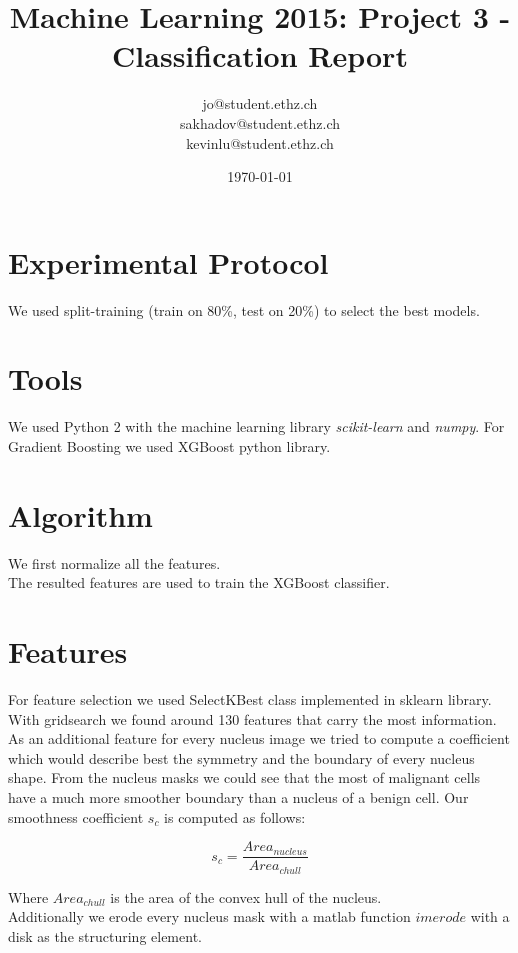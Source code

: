 \documentclass[a4paper, 11pt]{article}
\title{Machine Learning 2015: Project 3 - Classification Report}
\author{jo@student.ethz.ch\\ sakhadov@student.ethz.ch\\ kevinlu@student.ethz.ch\\}
\date{\today}
\begin{document}
\maketitle

\section*{Experimental Protocol}
We used split-training (train on 80\%, test on 20\%) to select the best models. \\




\section{Tools}
We used Python 2 with the machine learning library \textit{scikit-learn} and \textit{numpy}. For Gradient Boosting we used XGBoost python library.

\section{Algorithm}
We first normalize all the features.\\
The resulted features are used to train the XGBoost classifier.\\

\section{Features}
For feature selection we used SelectKBest class implemented in sklearn library. With gridsearch we found around 130 features that carry the most information.\\
As an additional feature for every nucleus image we tried to compute a coefficient which would describe best the symmetry and the boundary of every nucleus shape. From the nucleus masks we could see that the most of malignant cells have a much more smoother boundary than a nucleus of a benign cell. Our smoothness coefficient $s_c$ is computed as follows:

\begin{equation}
s_c = \frac{ Area_{nucleus} }{Area_{chull}}
\end{equation}

Where $Area_{chull}$ is the area of the convex hull of the nucleus.\\
Additionally we erode every nucleus mask with a matlab function $imerode$ with a disk as the structuring element.\\
\end{document}
